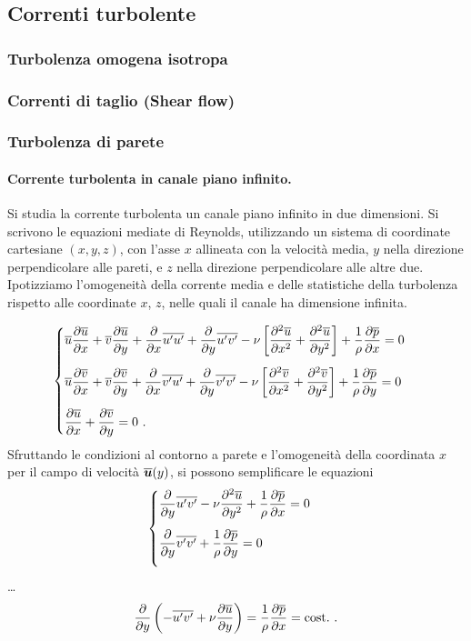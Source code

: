 \subsection{Correnti turbolente}
\subsubsection{Turbolenza omogena isotropa}
\subsubsection{Correnti di taglio (Shear flow)}
\subsubsection{Turbolenza di parete}
\paragraph{Corrente turbolenta in canale piano infinito.}
Si studia la corrente turbolenta un canale piano infinito in due dimensioni. Si scrivono le equazioni mediate di Reynolds, utilizzando un sistema di coordinate cartesiane $(x,y,z)$, con l'asse $x$ allineata con la velocità media, $y$ nella direzione perpendicolare alle pareti, e $z$ nella direzione perpendicolare alle altre due. Ipotizziamo l'omogeneità della corrente media e delle statistiche della turbolenza rispetto alle coordinate $x$, $z$, nelle quali il canale ha dimensione infinita.

\begin{equation}
\begin{cases}
 \avg{u} \p{\avg{u}}{x} + \avg{v} \p{\avg{u}}{y} + \p{}{x}\avg{u'u'} + \p{}{y}\avg{u'v'} - \nu \left[ \p{^2 \avg u}{x^2} + \p{^2 \avg u}{y^2} \right] + \f{1}{\rho} \p{\pa}{x} = 0  \vspace{0.3cm} \\
 \avg{u} \p{\avg{v}}{x} + \avg{v} \p{\avg{v}}{y} + \p{}{x}\avg{v'u'} + \p{}{y}\avg{v'v'} - \nu \left[ \p{^2 \avg v}{x^2} + \p{^2 \avg v}{y^2} \right] + \f{1}{\rho} \p{\pa}{y} = 0  \vspace{0.3cm} \\
 \p{\avg{u}}{x} + \p{\avg{v}}{y} = 0 \ .
\end{cases}
\end{equation}
Sfruttando le condizioni al contorno a parete e l'omogeneità della coordinata $x$ per il campo di velocità $\overline{\bm{u}}(y)$, si possono semplificare le equazioni
\begin{equation}
\begin{cases}
 \p{}{y}\avg{u'v'} - \nu \p{^2 \avg u}{y^2}  + \f{1}{\rho} \p{\pa}{x} = 0  \vspace{0.3cm} \\
 \p{}{y}\avg{v'v'}                           + \f{1}{\rho} \p{\pa}{y} = 0  \vspace{0.3cm} \\
\end{cases}
\end{equation}
\dots
\begin{equation}
  \dfrac{\partial{}}{\partial{y}}\left( - \overline{u'v'} + \nu \dfrac{\partial{\overline{u}}}{\partial{y}} \right) = \dfrac{1}{\rho}\dfrac{\partial{\overline{p}}}{\partial{x}} = \text{cost.} \ .
\end{equation}


